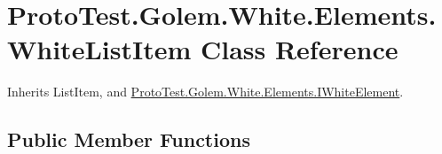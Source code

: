 \hypertarget{class_proto_test_1_1_golem_1_1_white_1_1_elements_1_1_white_list_item}{\section{Proto\-Test.\-Golem.\-White.\-Elements.\-White\-List\-Item Class Reference}
\label{class_proto_test_1_1_golem_1_1_white_1_1_elements_1_1_white_list_item}
}


Inherits List\-Item, and \hyperlink{interface_proto_test_1_1_golem_1_1_white_1_1_elements_1_1_i_white_element}{Proto\-Test.\-Golem.\-White.\-Elements.\-I\-White\-Element}.

\subsection*{Public Member Functions}
